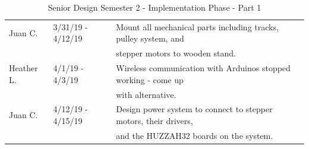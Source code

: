 \begin{table} [H]
\begin{tabular}{|l|l|l|}
		\hline
		Juan C. & 3/31/19 - 4/12/19 	& Mount all mechanical parts including tracks, pulley system, and \\
				&						& stepper motors to wooden stand. \\
		\hline
		Heather L. & 4/1/19 - 4/3/19 	& Wireless communication with Arduinos stopped working - come up \\  	&						& with alternative. \\
		\hline
		Juan C. & 4/12/19 - 4/15/19 	& Design power system to connect to stepper motors, their drivers, \\
		 		&						& and the HUZZAH32 boards on the system. \\
		\hline
	\end{tabular} 
\caption{Senior Design Semester 2 - Implementation Phase - Part 1}
\label{table:4}
\end{table}		
		
